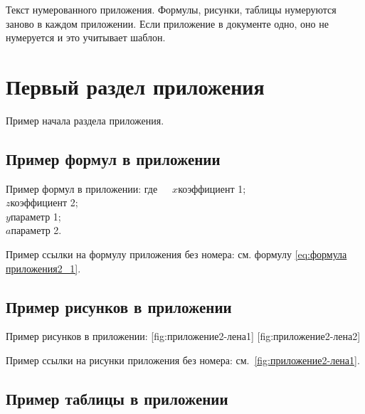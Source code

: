 \newpage{}
\setcounter{equation}{0} %
\setcounter{table}{0} %
\setcounter{illustration}{0} %
\setcounter{section}{0} %

Текст нумерованного приложения. Формулы, рисунки, таблицы нумеруются заново в каждом приложении. Если приложение в документе одно, оно не нумеруется и это учитывает шаблон.
\\
\section{Первый раздел приложения}

Пример начала раздела приложения.

\subsection{Пример формул в приложении}

Пример формул в приложении:
%
\noindent где~~~$x$\ndash коэффициент 1; \\
\indent $z$\ndash коэффициент 2;\\
\indent $y$\ndash параметр 1;\\
\indent $a$\ndash параметр 2.

Пример ссылки на формулу приложения без номера: см. формулу \ref{eq:формула приложения2_1}.

\subsection{Пример рисунков в приложении}

Пример рисунков в приложении:
[fig:приложение2-лена1]
[fig:приложение2-лена2]

Пример ссылки на рисунки приложения без номера: см.~\ref{fig:приложение2-лена1}.

\subsection{Пример таблицы в приложении}

